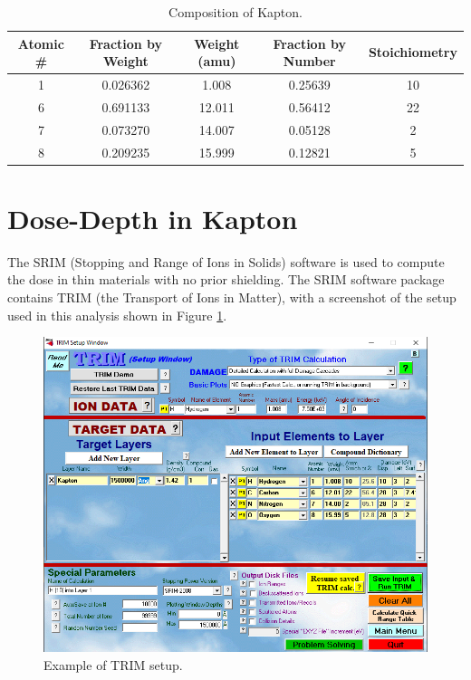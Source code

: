 \documentclass{hitec}
\begin{document}
\begin{table}[!h]\centering
	\caption{Composition of Kapton.}\label{tab:Kapton_composition}
	\begin{tabular}{|c | c | c | c | c |}\hline
		Atomic \# & Fraction by Weight & Weight (amu) & Fraction by Number & Stoichiometry\\\hline
		1	& 0.026362	&  1.008 & 0.25639 & 10\\\hline
		6	& 0.691133	& 12.011 & 0.56412 & 22\\\hline
		7	& 0.073270	& 14.007 & 0.05128 &  2\\\hline
		8	& 0.209235	& 15.999 & 0.12821 &  5\\\hline	
	\end{tabular}
\end{table}

\section{Dose-Depth in Kapton}

The SRIM (Stopping and Range of Ions in Solids) software is used to compute the dose in thin materials with no prior shielding. The SRIM software package contains TRIM (the Transport of Ions in Matter), with a screenshot of the setup used in this analysis shown in Figure \ref{fig:SRIM_setup}.

\begin{figure}[htbp!]
	\centering
	\includegraphics[width=1\textwidth]{../SRIM_setup.PNG}
	\caption{Example of TRIM setup.}\label{fig:SRIM_setup}
\end{figure}
\end{document}
